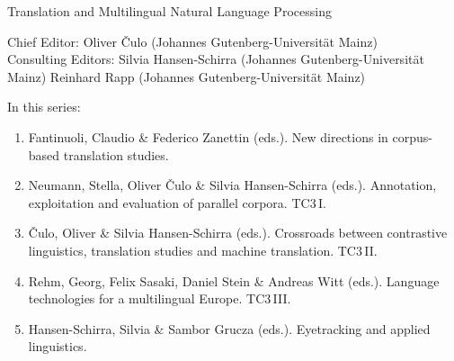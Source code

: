 {\large Translation and Multilingual Natural Language Processing}

\bigskip

Chief Editor: Oliver \v{C}ulo (Johannes Gutenberg-Universität Mainz) \\
Consulting Editors: Silvia Hansen-Schirra (Johannes Gutenberg-Universität Mainz)
Reinhard Rapp (Johannes Gutenberg-Universität Mainz)

\bigskip

In this series:

\begin{enumerate}
\item Fantinuoli, Claudio \& Federico Zanettin (eds.). New directions in corpus-based translation studies.
\item Neumann, Stella, Oliver Čulo \& Silvia Hansen-Schirra (eds.). Annotation, exploitation and evaluation of parallel corpora. TC3\,I.
\item Čulo, Oliver  \& Silvia Hansen-Schirra (eds.). Crossroads between contrastive linguistics, translation studies and machine translation. TC3\,II.
\item Rehm, Georg, Felix Sasaki, Daniel Stein \& Andreas Witt (eds.). Language technologies for a multilingual Europe. TC3\,III.
\item Hansen-Schirra, Silvia \& Sambor Grucza (eds.). Eyetracking and applied linguistics.
\end{enumerate}

 